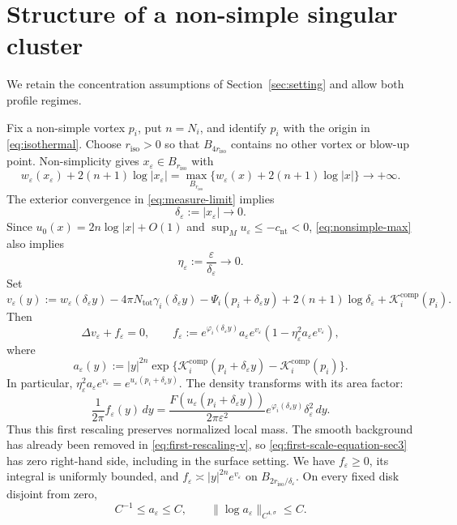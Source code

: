 \documentclass[11pt,reqno]{amsart}
\numberwithin{equation}{section}
\theoremstyle{definition}
\theoremstyle{remark}
\newcommand{\eps}{\varepsilon}
\newcommand{\etae}{\eta_{\eps}}
\newcommand{\de}{\delta_{\eps}}
\newcommand{\we}{w_{\eps}}
\newcommand{\comp}{\mathrm{comp}}
\newcommand{\tot}{\mathrm{tot}}
\begin{document}
\section{Structure of a non-simple singular cluster}
\label{sec:cluster}

We retain the concentration assumptions of Section~\ref{sec:setting}
and allow both profile regimes.

Fix a non-simple vortex $p_i$, put $n=N_i$, and identify $p_i$ with
the origin in \eqref{eq:isothermal}. Choose $r_{\mathrm{iso}}>0$ so that $B_{4r_{\mathrm{iso}}}$
contains no other vortex or blow-up point. Non-simplicity gives
$x_\eps\in B_{r_{\mathrm{iso}}}$ with
\begin{equation}\label{eq:nonsimple-max}
 \we(x_\eps)+2(n+1)\log|x_\eps|
 =\max_{B_{r_{\mathrm{iso}}}}\{\we(x)+2(n+1)\log|x|\}
 \longrightarrow+\infty.
\end{equation}
The exterior convergence in \eqref{eq:measure-limit} implies
\begin{equation}\label{eq:clustering-scale}
 \de:=|x_\eps|\longrightarrow0.
\end{equation}
Since $u_0(x)=2n\log|x|+O(1)$ and
$\sup_Mu_\eps\le-c_{\mathrm{nt}}<0$,
\eqref{eq:nonsimple-max} also implies
\begin{equation}\label{eq:eta}
 \etae:=\frac{\eps}{\de}\longrightarrow0.
\end{equation}
Set
\begin{equation}\label{eq:first-rescaling-v}
 v_\eps(y):=\we(\de y)-4\pi N_{\tot}\gamma_i(\de y)
 -\Psi_i(p_i+\de y)+2(n+1)\log\de
 +\mathcal K_i^{\comp}(p_i).
\end{equation}
Then
\begin{equation}\label{eq:first-scale-equation-sec3}
 \Delta v_\eps+f_\eps=0,\qquad
 f_\eps:=e^{\varphi_i(\de y)}a_\eps e^{v_\eps}
       (1-\etae^2a_\eps e^{v_\eps}),
\end{equation}
where
\begin{equation}\label{eq:first-scale-coefficient-sec3}
 a_\eps(y):=|y|^{2n}
 \exp\{\mathcal K_i^{\comp}(p_i+\de y)
             -\mathcal K_i^{\comp}(p_i)\}.
\end{equation}
In particular, $\etae^2a_\eps e^{v_\eps}=e^{u_\eps(p_i+\de y)}$.
The density transforms with its area factor:
\begin{equation}\label{eq:first-scale-measure}
 \frac1{2\pi}f_\eps(y)\,dy
 =\frac{F(u_\eps(p_i+\de y))}{2\pi\eps^2}
                     e^{\varphi_i(\de y)}\de^2\,dy.
\end{equation}
Thus this first rescaling preserves normalized local mass.
The smooth background has already been removed in
\eqref{eq:first-rescaling-v}, so \eqref{eq:first-scale-equation-sec3}
has zero right-hand side, including in the surface setting.
We have $f_\eps\ge0$, its integral is uniformly bounded, and
$f_\eps\asymp |y|^{2n}e^{v_\eps}$ on $B_{2r_{\mathrm{iso}}/\de}$. On every fixed
disk disjoint from zero,
\begin{equation}\label{eq:a-uniform}
 C^{-1}\le a_\eps\le C,\qquad
 \|\log a_\eps\|_{C^{4,\sigma}}\le C.
\end{equation}
\end{document}
